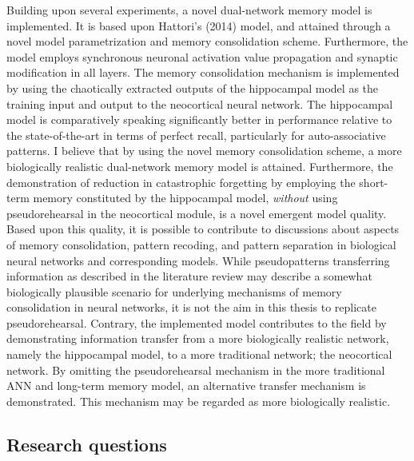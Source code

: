 Building upon several experiments, a novel dual-network memory model is implemented. It is based upon Hattori's (2014) model, and attained through a novel model parametrization and memory consolidation scheme. Furthermore, the model employs synchronous neuronal activation value propagation and synaptic modification in all layers. The memory consolidation mechanism is implemented by using the chaotically extracted outputs of the hippocampal model as the training input and output to the neocortical neural network. The hippocampal model is comparatively speaking significantly better in performance relative to the state-of-the-art in terms of perfect recall, particularly for auto-associative patterns. I believe that by using the novel memory consolidation scheme, a more biologically realistic dual-network memory model is attained. Furthermore, the demonstration of reduction in catastrophic forgetting by employing the short-term memory constituted by the hippocampal model, \textit{without} using pseudorehearsal in the neocortical module, is a novel emergent model quality. Based upon this quality, it is possible to contribute to discussions about aspects of memory consolidation, pattern recoding, and pattern separation in biological neural networks and corresponding models.
While pseudopatterns transferring information as described in the literature review may describe a somewhat biologically plausible scenario for underlying mechanisms of memory consolidation in neural networks, it is not the aim in this thesis to replicate pseudorehearsal. Contrary, the implemented model contributes to the field by demonstrating information transfer from a more biologically realistic network, namely the hippocampal model, to a more traditional network; the neocortical network. By omitting the pseudorehearsal mechanism in the more traditional ANN and long-term memory model, an alternative transfer mechanism is demonstrated. This mechanism may be regarded as more biologically realistic.


\subsection*{Research questions}


